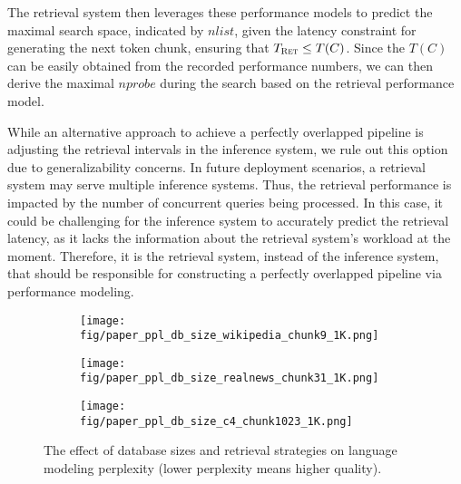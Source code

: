 The retrieval system then leverages these performance models to predict the maximal search space, indicated by $nlist$, given the latency constraint for generating the next token chunk, ensuring that \( T_{\textsc{Ret}} \leq T(C) \). 
Since the \( T(C) \) can be easily obtained from the recorded performance numbers, we can then derive the maximal \( nprobe \) during the search based on the retrieval performance model.

While an alternative approach to achieve a perfectly overlapped pipeline is adjusting the retrieval intervals in the inference system, we rule out this option due to generalizability concerns. In future deployment scenarios, a retrieval system may serve multiple inference systems. Thus, the retrieval performance is impacted by the number of concurrent queries being processed. In this case, it could be challenging for the inference system to accurately predict the retrieval latency, as it lacks the information about the retrieval system's workload at the moment. Therefore, it is the retrieval system, instead of the inference system, that should be responsible for constructing a perfectly overlapped pipeline via performance modeling.

\begin{figure*}[t]
\begin{subfigure}
    \centering
    \texttt{[image: fig/paper\_ppl\_db\_size\_wikipedia\_chunk9\_1K.png]}
\end{subfigure}
\hfill
\begin{subfigure}
    \centering
    \texttt{[image: fig/paper\_ppl\_db\_size\_realnews\_chunk31\_1K.png]}
\end{subfigure}
\hfill
\begin{subfigure}
    \centering
    \texttt{[image: fig/paper\_ppl\_db\_size\_c4\_chunk1023\_1K.png]}
\end{subfigure}
\hfill

  \vspace{-1em}
  \caption{The effect of database sizes and retrieval strategies on language modeling perplexity (lower perplexity means higher quality).}
  \label{fig:eval_dbsize}
\end{figure*}

